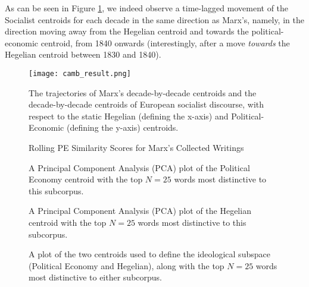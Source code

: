 As can be seen in Figure \ref{fig:cambresult}, we indeed observe a time-lagged movement of the Socialist centroids for each decade in the same direction as Marx's, namely, in the direction moving away from the Hegelian centroid and towards the political-economic centroid, from 1840 onwards (interestingly, after a move \textit{towards} the Hegelian centroid between 1830 and 1840).

\begin{figure}[ht!]
    \centering
    \texttt{[image: camb\_result.png]}
    \caption{The trajectories of Marx's decade-by-decade centroids and the decade-by-decade centroids of European socialist discourse, with respect to the static Hegelian (defining the x-axis) and Political-Economic (defining the y-axis) centroids.}
    \label{fig:cambresult}
\end{figure}

\begin{figure}[ht!]
\centering

\caption{Rolling PE Similarity Scores for Marx's Collected Writings}
\end{figure}

\begin{figure}[ht!]
  \centering
  
  \caption{A Principal Component Analysis (PCA) plot of the Political Economy centroid with the top $N = 25$ words most distinctive to this subcorpus.}
  \label{fig:pecentroid}
\end{figure}

\begin{figure}[ht!]
  \centering
  
  \caption{A Principal Component Analysis (PCA) plot of the Hegelian centroid with the top $N = 25$ words most distinctive to this subcorpus.}
  \label{fig:hegcentroid}
\end{figure}

\begin{figure}[ht!]
  \centering
  
  \caption{A plot of the two centroids used to define the ideological subspace (Political Economy and Hegelian), along with the top $N = 25$ words most distinctive to either subcorpus.}
  \label{fig:combcentroid}
\end{figure}
